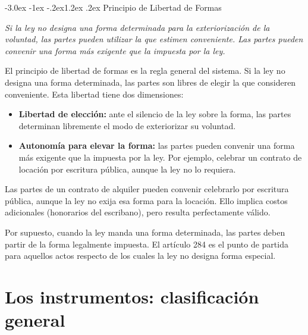 \documentclass[12pt,oneside]{book}
\makeatletter
\renewcommand\section{\@startsection{section}{1}{\z@}%
  {-3.0ex \@plus -1ex \@minus -.2ex}{1.2ex \@plus .2ex}%
  {\normalfont\large\bfseries\color{acento}}}
\makeatother
\begin{document}

\section{Principio de Libertad de Formas}

\begin{regla}
\textit{Si la ley no designa una forma determinada para la exteriorización de la voluntad, las partes pueden utilizar la que estimen conveniente. Las partes pueden convenir una forma más exigente que la impuesta por la ley.}
\end{regla}

El principio de libertad de formas es la regla general del sistema. Si la ley no designa una forma determinada, las partes son libres de elegir la que consideren conveniente. Esta libertad tiene dos dimensiones:

\begin{itemize}
    \item \textbf{Libertad de elección:} ante el silencio de la ley sobre la forma, las partes determinan libremente el modo de exteriorizar su voluntad.
    \item \textbf{Autonomía para elevar la forma:} las partes pueden convenir una forma más exigente que la impuesta por la ley. Por ejemplo, celebrar un contrato de locación por escritura pública, aunque la ley no lo requiera.
\end{itemize}

\begin{ejemplo}
Las partes de un contrato de alquiler pueden convenir celebrarlo por escritura pública, aunque la ley no exija esa forma para la locación. Ello implica costos adicionales (honorarios del escribano), pero resulta perfectamente válido.
\end{ejemplo}

Por supuesto, cuando la ley manda una forma determinada, las partes deben partir de la forma legalmente impuesta. El artículo 284 es el punto de partida para aquellos actos respecto de los cuales la ley no designa forma especial.


\chapter{Los instrumentos: clasificación general}
\end{document}
